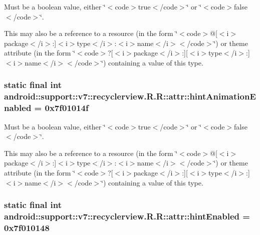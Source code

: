Must be a boolean value, either \char`\"{}$<$code$>$true$<$/code$>$\char`\"{} or \char`\"{}$<$code$>$false$<$/code$>$\char`\"{}. 

This may also be a reference to a resource (in the form \char`\"{}$<$code$>$@\mbox{[}$<$i$>$package$<$/i$>$:\mbox{]}$<$i$>$type$<$/i$>$:$<$i$>$name$<$/i$>$$<$/code$>$\char`\"{}) or theme attribute (in the form \char`\"{}$<$code$>$?\mbox{[}$<$i$>$package$<$/i$>$:\mbox{]}\mbox{[}$<$i$>$type$<$/i$>$:\mbox{]}$<$i$>$name$<$/i$>$$<$/code$>$\char`\"{}) containing a value of this type. \hypertarget{classandroid_1_1support_1_1v7_1_1recyclerview_1_1_r_1_1attr_d99f0f1b7dcfa5d0fe951d7cead18ca4}{
\subsubsection[{hintAnimationEnabled}]{\setlength{\rightskip}{0pt plus 5cm}static final int android::support::v7::recyclerview.R.R::attr::hintAnimationEnabled = 0x7f01014f}}
\label{classandroid_1_1support_1_1v7_1_1recyclerview_1_1_r_1_1attr_d99f0f1b7dcfa5d0fe951d7cead18ca4}


Must be a boolean value, either \char`\"{}$<$code$>$true$<$/code$>$\char`\"{} or \char`\"{}$<$code$>$false$<$/code$>$\char`\"{}. 

This may also be a reference to a resource (in the form \char`\"{}$<$code$>$@\mbox{[}$<$i$>$package$<$/i$>$:\mbox{]}$<$i$>$type$<$/i$>$:$<$i$>$name$<$/i$>$$<$/code$>$\char`\"{}) or theme attribute (in the form \char`\"{}$<$code$>$?\mbox{[}$<$i$>$package$<$/i$>$:\mbox{]}\mbox{[}$<$i$>$type$<$/i$>$:\mbox{]}$<$i$>$name$<$/i$>$$<$/code$>$\char`\"{}) containing a value of this type. \hypertarget{classandroid_1_1support_1_1v7_1_1recyclerview_1_1_r_1_1attr_1da334e4ee8db533cb44cae6e6deddb3}{
\subsubsection[{hintEnabled}]{\setlength{\rightskip}{0pt plus 5cm}static final int android::support::v7::recyclerview.R.R::attr::hintEnabled = 0x7f010148}}
\label{classandroid_1_1support_1_1v7_1_1recyclerview_1_1_r_1_1attr_1da334e4ee8db533cb44cae6e6deddb3}


